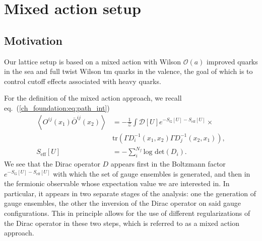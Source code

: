 \chapter{Mixed action setup}


\label{ch_ma}


\section{Motivation}
\label{ch_ma:sec:introduction}

Our lattice setup is based on a mixed action with Wilson $\mathcal{O}(a)$ improved quarks in the sea and full twist Wilson tm quarks in the valence, the goal of which is to control cutoff effects associated with heavy quarks.

For the definition of the mixed action approach, we recall eq.~(\ref{ch_foundation:eq:path_int})
\begin{align}
\left<O^{ij}(x_1)\bar{O}^{ij}(x_2)\right>&=-\frac{1}{\mathcal{Z}}\int\mathcal{D}[U]e^{-S_{\textrm{G}}[U]-S_{\textrm{eff}}[U]}\times\\&{\textrm{tr}}\left(\Gamma D_i^{-1}(x_1,x_2)\Gamma D_j^{-1}(x_2,x_1)\right),\\
S_{\textrm{eff}}[U]&=-\sum_i^{N_f}\textrm{log det}(D_i).
\end{align} 
We see that the Dirac operator $D$ appears first in the Boltzmann factor $e^{-S_{\textrm{G}}[U]-S_{\textrm{eff}}[U]}$ with which the set of gauge ensembles is generated, and then in the fermionic observable whose expectation value we are interested in. In particular, it appears in two separate stages of the analysis: one the generation of gauge ensembles, the other the inversion of the Dirac operator on said gauge configurations. This in principle allows for the use of different regularizations of the Dirac operator in these two steps, which is referred to as a mixed action approach.

